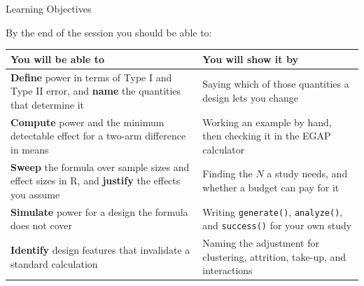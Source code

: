 \documentclass[
  ignorenonframetext,
  aspectratio=169,
]{beamer}
\begin{document}
\begin{frame}{Learning Objectives}
\label{learning-objectives}
\vspace{0.3em}

\small By the end of the session you should be able to:

\vspace{0.4em}

\begin{center}
\scriptsize
\setlength{\tabcolsep}{7pt}
\renewcommand{\arraystretch}{1.15}
\begin{tabular}{>{\raggedright\arraybackslash}p{7.3cm}>{\raggedright\arraybackslash}p{5.4cm}}
\toprule
\textbf{You will be able to} & \textbf{You will show it by} \\
\midrule
\textbf{Define} power in terms of Type I and Type II error, and \textbf{name} the quantities that determine it
  & Saying which of those quantities a design lets you change \\
\textbf{Compute} power and the minimum detectable effect for a two-arm difference in means
  & Working an example by hand, then checking it in the EGAP calculator \\
\textbf{Sweep} the formula over sample sizes and effect sizes in R, and \textbf{justify} the effects you assume
  & Finding the $N$ a study needs, and whether a budget can pay for it \\
\textbf{Simulate} power for a design the formula does not cover
  & Writing \texttt{generate()}, \texttt{analyze()}, and \texttt{success()} for your own study \\
\textbf{Identify} design features that invalidate a standard calculation
  & Naming the adjustment for clustering, attrition, take-up, and interactions \\
\bottomrule
\end{tabular}
\end{center}
\end{frame}
\end{document}
